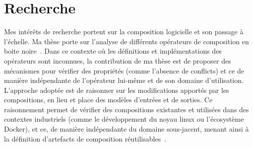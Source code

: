 \documentclass[11pt,a4paper,sans]{moderncv}        %
\begin{document}

\section{Recherche}
Mes intérêts de recherche portent sur la composition logicielle et son passage à l'échelle. 
Ma thèse porte sur l'analyse de différents opérateurs de composition en boite noire~\cite{benni:hal-01659776,benni:hal-01722040}.
Dans ce contexte où les définitions et implémentations des opérateurs sont inconnues, la contribution de ma thèse est de proposer des mécanismes pour vérifier des propriétés (comme l'absence de conflicts) et ce de manière indépendante de l'opérateur lui-même et de son domaine d'utilisation. 
L'approche adoptée est de raisonner sur les modifications apportés par les compositions, en lieu et place des modèles d'entrées et de sorties.
Ce raisonnement permet de vérifier des compositions existantes et utilisées dans des contextes industriels (comme le développement du noyau linux ou l'écosystème Docker), et ce, de manière indépendante du domaine sous-jacent, menant ainsi à la définition d'artefacts de composition réutilisables~\cite{doi:10.1002/smr.2208}.
\end{document}
